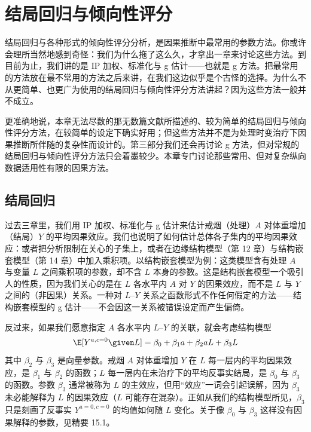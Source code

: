 \chapter{结局回归与倾向性评分}

结局回归与各种形式的倾向性评分分析，是因果推断中最常用的参数方法。你或许会理所当然地感到奇怪：我们为什么拖了这么久，才拿出一章来讨论这些方法。到目前为止，我们讲的是 IP 加权、标准化与 g 估计——也就是 g 方法。把最常用的方法放在最不常用的方法之后来讲，在我们这边似乎是个古怪的选择。为什么不从更简单、也更广为使用的结局回归与倾向性评分方法讲起？因为这些方法一般并不成立。

更准确地说，本章无法尽数的那无数篇文献所描述的、较为简单的结局回归与倾向性评分方法，在较简单的设定下确实好用；但这些方法并不是为处理时变治疗下因果推断所伴随的复杂性而设计的。第三部分我们还会再讨论 g 方法，但对常规的结局回归与倾向性评分方法只会着墨较少。本章专门讨论那些常用、但对复杂纵向数据适用性有限的因果方法。

\section{结局回归}

过去三章里，我们用 IP 加权、标准化与 g 估计来估计戒烟（处理）$A$ 对体重增加（结局）$Y$ 的平均因果效应。我们也说明了如何估计总体各子集内的平均因果效应：或者把分析限制在关心的子集上，或者在边缘结构模型（第 12 章）与结构嵌套模型（第 14 章）中加入乘积项。以结构嵌套模型为例：这类模型含有处理 $A$ 与变量 $L$ 之间乘积项的参数，却不含 $L$ 本身的参数。这是结构嵌套模型一个吸引人的性质，因为我们关心的是在 $L$ 各水平内 $A$ 对 $Y$ 的因果效应，而不是 $L$ 与 $Y$ 之间的（非因果）关系。一种对 $L$–$Y$ 关系之函数形式不作任何假定的方法——结构嵌套模型的 g 估计——不会因这一关系被错误设定而产生偏倚。

反过来，如果我们愿意指定 $A$ 各水平内 $L$–$Y$ 的关联，就会考虑结构模型
\[
\E[Y^{a,c=0}\given L]=\beta_0+\beta_1 a+\beta_2 aL+\beta_3 L
\]
其中 $\beta_2$ 与 $\beta_3$ 是向量参数。戒烟 $A$ 对体重增加 $Y$ 在 $L$ 每一层内的平均因果效应，是 $\beta_1$ 与 $\beta_2$ 的函数；$L$ 每一层内在未治疗下的平均反事实结局，是 $\beta_0$ 与 $\beta_3$ 的函数。参数 $\beta_3$ 通常被称为 $L$ 的主效应，但用“效应”一词会引起误解，因为 $\beta_3$ 未必能解释为 $L$ 的因果效应（$L$ 可能存在混杂）。正如从我们的结构模型所见，$\beta_3$ 只是刻画了反事实 $Y^{a=0,c=0}$ 的均值如何随 $L$ 变化。关于像 $\beta_0$ 与 $\beta_3$ 这样没有因果解释的参数，见精要 15.1。

